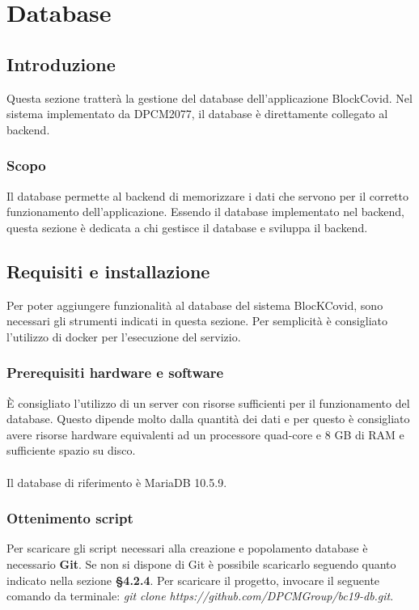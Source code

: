 \section{Database}
\subsection{Introduzione}
Questa sezione tratterà la gestione del database dell'applicazione BlockCovid. Nel sistema implementato da DPCM2077, il database è direttamente collegato al backend.

\subsubsection{Scopo}
Il database permette al backend di memorizzare i dati che servono per il corretto funzionamento dell'applicazione. Essendo il database implementato nel backend, questa sezione è dedicata a chi gestisce il database e sviluppa il backend.

\subsection{Requisiti e installazione}
Per poter aggiungere funzionalità al database del sistema BlocKCovid, sono necessari gli strumenti indicati in questa sezione. Per semplicità è consigliato l'utilizzo di docker per l'esecuzione del servizio.

\subsubsection{Prerequisiti hardware e software}
È consigliato l'utilizzo di un server con risorse sufficienti per il funzionamento del database. Questo dipende molto dalla quantità dei dati e per questo è consigliato avere risorse hardware equivalenti ad un processore quad-core e 8 GB di RAM e sufficiente spazio su disco.
\\\\
Il database di riferimento è MariaDB 10.5.9.

\subsubsection{Ottenimento script}
Per scaricare gli script necessari alla creazione e popolamento database è necessario \textbf{Git}. Se non si dispone di Git è possibile scaricarlo seguendo quanto indicato nella sezione \textbf{§4.2.4}. Per scaricare il progetto, invocare il seguente comando da terminale: \textit{git clone https://github.com/DPCMGroup/bc19-db.git}.

